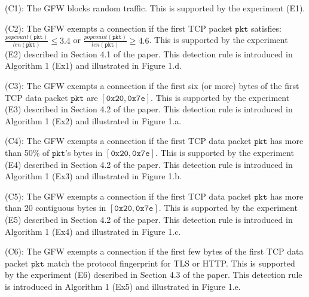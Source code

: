 \begin{compactdesc}

    \item[(C1):] \textit{}
    The GFW blocks random traffic.
    This is supported by the experiment (E1).

    \item[(C2):] \textit{}
    The GFW exempts a connection if
    the first TCP packet $\mathtt{pkt}$ satisfies:
    $\frac{\mathit{popcount}(\mathtt{pkt})}{\mathit{len}(\mathtt{pkt})} \le 3.4$ or 
    $\frac{\mathit{popcount}(\mathtt{pkt})}{\mathit{len}(\mathtt{pkt})} \ge 4.6$. 
    This is supported by the experiment (E2) described in Section 4.1 of the paper. 
    This detection rule is introduced in Algorithm 1 (Ex1)
    and illustrated in Figure 1.d.

    \item[(C3):] \textit{}
    The GFW exempts a connection if
    the first six (or more) bytes of the first TCP data packet $\mathtt{pkt}$ are 
    $[\mathtt{0x20},\mathtt{0x7e}]$. 
    This is supported by the experiment (E3) described in Section 4.2 of the paper. 
    This detection rule is introduced in Algorithm 1 (Ex2)
    and illustrated in Figure 1.a.

    \item[(C4):] \textit{}
    The GFW exempts a connection if 
    the first TCP data packet $\mathtt{pkt}$ has 
    more than 50\% of $\mathtt{pkt}$'s bytes in $[\mathtt{0x20},\mathtt{0x7e}]$. 
    This is supported by the experiment (E4) described in Section 4.2 of the paper. 
    This detection rule is introduced in Algorithm 1 (Ex3)
    and illustrated in Figure 1.b.

    \item[(C5):] \textit{}
    The GFW exempts a connection if 
    the first TCP data packet $\mathtt{pkt}$ has 
    more than 20 contiguous bytes in
    $[\mathtt{0x20},\mathtt{0x7e}]$. 
    This is supported by the experiment (E5) described in Section 4.2 of the paper. 
    This detection rule is introduced in Algorithm 1 (Ex4)
    and illustrated in Figure 1.c.

    \item[(C6):] \textit{}
    The GFW exempts a connection if 
    the first few bytes of the first TCP data packet $\mathtt{pkt}$
    match the protocol fingerprint for TLS or HTTP.
    This is supported by the experiment (E6) described in Section 4.3 of the paper. 
    This detection rule is introduced in Algorithm 1 (Ex5)
    and illustrated in Figure 1.e.

\end{compactdesc}

